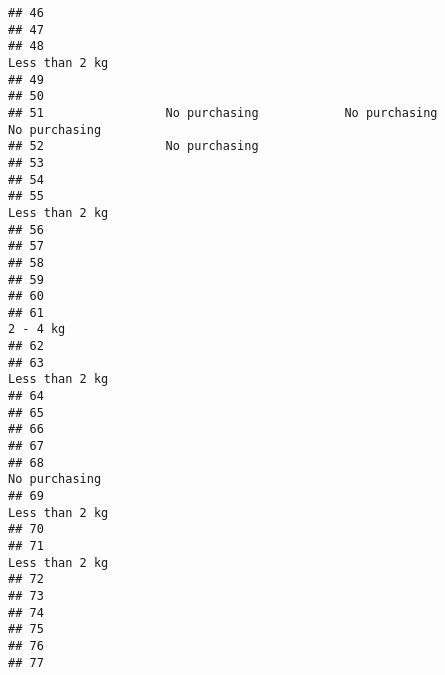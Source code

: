 \documentclass[
]{article}
\begin{document}
\begin{verbatim}
## 46                                                                             
## 47                                                                             
## 48                                                               Less than 2 kg
## 49                                                                             
## 50                                                                             
## 51                 No purchasing            No purchasing         No purchasing
## 52                 No purchasing                                               
## 53                                                                             
## 54                                                                             
## 55                                                               Less than 2 kg
## 56                                                                             
## 57                                                                             
## 58                                                                             
## 59                                                                             
## 60                                                                             
## 61                                                                     2 - 4 kg
## 62                                                                             
## 63                                                               Less than 2 kg
## 64                                                                             
## 65                                                                             
## 66                                                                             
## 67                                                                             
## 68                                                                No purchasing
## 69                                                               Less than 2 kg
## 70                                                                             
## 71                                                               Less than 2 kg
## 72                                                                             
## 73                                                                             
## 74                                                                             
## 75                                                                             
## 76                                                                             
## 77                                                                             

\end{verbatim}
\end{document}
